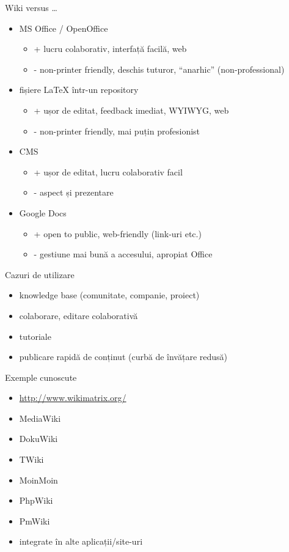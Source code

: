 \documentclass{beamer}
\begin{document}
\begin{frame}{Wiki versus \ldots}
  \begin{itemize}
    \item MS Office / OpenOffice
      \begin{itemize}
        \item + lucru colaborativ, interfață facilă, web
        \item - non-printer friendly, deschis tuturor, ``anarhic''
    (non-professional)
      \end{itemize}
    \item fișiere LaTeX într-un repository
      \begin{itemize}
        \item + ușor de editat, feedback imediat, WYIWYG, web
        \item - non-printer friendly, mai puțin profesionist
      \end{itemize}
    \item CMS
      \begin{itemize}
        \item + ușor de editat, lucru colaborativ facil
        \item - aspect și prezentare
      \end{itemize}
    \item Google Docs
      \begin{itemize}
        \item + open to public, web-friendly (link-uri etc.)
        \item - gestiune mai bună a accesului, apropiat Office
      \end{itemize}
  \end{itemize}
\end{frame}

\begin{frame}{Cazuri de utilizare}
  \begin{itemize}
    \item knowledge base (comunitate, companie, proiect)
    \item colaborare, editare colaborativă
    \item tutoriale
    \item publicare rapidă de conținut (curbă de învățare redusă)
  \end{itemize}
\end{frame}

\begin{frame}{Exemple cunoscute}
  \begin{itemize}
    \item \url{http://www.wikimatrix.org/}
    \item MediaWiki
    \item DokuWiki
    \item TWiki
    \item MoinMoin
    \item PhpWiki
    \item PmWiki
    \item integrate în alte aplicații/site-uri
  \end{itemize}
\end{frame}
\end{document}
